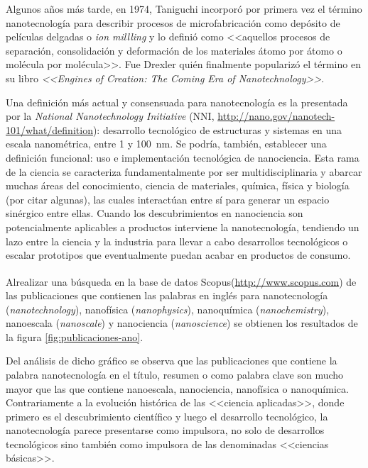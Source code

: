 	 Algunos años más tarde, en 1974, Taniguchi incorporó por primera vez el término nanotecnología para describir procesos de microfabricación como depósito de películas delgadas o \textit{ion millling} y lo definió como <<aquellos procesos de separación, consolidación y deformación de los materiales átomo por átomo o molécula por molécula>>. \cite{taniguchi1974} Fue Drexler quién finalmente popularizó el término en su libro \textit{<<Engines of Creation: The Coming Era of Nanotechnology>>}\cite{drexler1987}. 

	 Una definición más actual y consensuada para nanotecnología es la presentada por la \textit{National Nanotechnology Initiative} (NNI, \url{http://nano.gov/nanotech-101/what/definition}): desarrollo tecnológico de estructuras y sistemas en una escala nanométrica, entre 1 y \SI{100}{\nm}. Se podría, también, establecer una definición funcional: uso e implementación tecnológica de nanociencia. Esta rama de la ciencia se caracteriza fundamentalmente por ser multidisciplinaria y abarcar muchas áreas del conocimiento, ciencia de materiales, química, física y biología (por citar algunas), las cuales interactúan entre sí para generar un espacio sinérgico entre ellas. Cuando los descubrimientos en nanociencia son potencialmente aplicables a productos interviene la nanotecnología, tendiendo un lazo entre la ciencia y la industria para llevar a cabo desarrollos tecnológicos o escalar prototipos que eventualmente puedan acabar en productos de consumo.
	
	 Al\space realizar una búsqueda en la base de datos Scopus\textsuperscript\textregistered (\url{http://www.scopus.com}) de las publicaciones que contienen las palabras en inglés para nanotecnología (\textit{nanotechnology}), nanofísica (\textit{nanophysics}), nanoquímica (\textit{nanochemistry}), nanoescala (\textit{nanoscale}) y nanociencia (\textit{nanoscience}) se obtienen los resultados de la figura \ref{fig:publicaciones-ano}. 

	 Del análisis de dicho gráfico se observa que las publicaciones que contiene la palabra nanotecnología en el título, resumen o como palabra clave son mucho mayor que las que contiene nanoescala, nanociencia, nanofísica o nanoquímica. Contrariamente a la evolución histórica de las <<ciencia aplicadas>>, donde primero es el descubrimiento científico y luego el desarrollo tecnológico, la nanotecnología parece presentarse como impulsora, no solo de desarrollos tecnológicos sino también como impulsora de las denominadas <<ciencias básicas>>.

